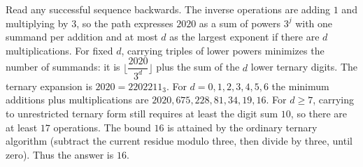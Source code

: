 Read any successful sequence backwards. The inverse operations are adding $1$ and multiplying by $3$, so the path expresses $2020$ as a sum of powers $3^j$ with one summand per addition and at most $d$ as the largest exponent if there are $d$ multiplications. For fixed $d$, carrying triples of lower powers minimizes the number of summands: it is $\lfloor\dfrac{2020}{3^d}\rfloor$ plus the sum of the $d$ lower ternary digits. The ternary expansion is $2020=2202211_3$. For $d=0,1,2,3,4,5,6$ the minimum additions plus multiplications are $2020,675,228,81,34,19,16$. For $d\ge7$, carrying to unrestricted ternary form still requires at least the digit sum $10$, so there are at least $17$ operations. The bound $16$ is attained by the ordinary ternary algorithm (subtract the current residue modulo three, then divide by three, until zero). Thus the answer is $\boxed{16}$.

